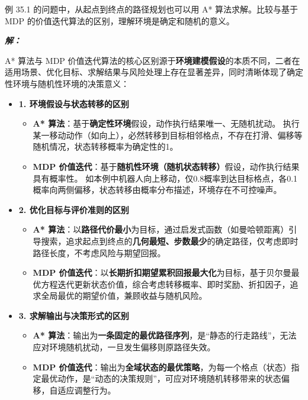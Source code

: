 \documentclass[12pt, a4paper]{article}
\newenvironment{solution}{
	\par\vspace{0.2cm}\noindent\textbf{\color{themecolor} \textit{解：}}
}{
	\par\vspace{0.5cm} %
}
\begin{document}
	\clearpage
	\begin{problem}[习题 35.8]
		例 35.1 的问题中，从起点到终点的路径规划也可以用 A* 算法求解。比较与基于 MDP 的价值迭代算法的区别，理解环境是确定和随机的意义。
	\end{problem}
	
	\begin{solution}
		A* 算法与 MDP 价值迭代算法的核心区别源于\textbf{环境建模假设}的本质不同，二者在适用场景、优化目标、求解结果与风险处理上存在显著差异，同时清晰体现了确定性环境与随机性环境的决策意义：
		
		\begin{itemize}
			\item[] \textbf{1. 环境假设与状态转移的区别}
			\begin{itemize}
				\item[] \textbf{A* 算法}：基于\textbf{确定性环境}假设，动作执行结果唯一、无随机扰动。
				执行某一移动动作（如向上），必然转移到目标相邻格点，不存在打滑、偏移等随机情况，状态转移概率为确定性的1。
				\item[] \textbf{MDP 价值迭代}：基于\textbf{随机性环境（随机状态转移）}假设，动作执行结果具有概率性。
				如本例中机器人向上移动，仅0.8概率到达目标格点，各0.1概率向两侧偏移，状态转移由概率分布描述，环境存在不可控噪声。
			\end{itemize}
			
			\item[] \textbf{2. 优化目标与评价准则的区别}
			\begin{itemize}
				\item[] \textbf{A* 算法}：以\textbf{路径代价最小}为目标，通过启发式函数（如曼哈顿距离）引导搜索，追求起点到终点的\textbf{几何最短、步数最少}的确定路径，仅考虑即时路径长度，不考虑风险与期望回报。
				\item[] \textbf{MDP 价值迭代}：以\textbf{长期折扣期望累积回报最大化}为目标，基于贝尔曼最优方程迭代更新状态价值，综合考虑转移概率、即时奖励、折扣因子，追求全局最优的期望价值，兼顾收益与随机风险。
			\end{itemize}
			
			\item[] \textbf{3. 求解输出与决策形式的区别}
			\begin{itemize}
				\item[] \textbf{A* 算法}：输出为\textbf{一条固定的最优路径序列}，是“静态的行走路线”，无法应对环境随机扰动，一旦发生偏移则原路径失效。
				\item[] \textbf{MDP 价值迭代}：输出为\textbf{全域状态的最优策略}，为每一个格点（状态）指定最优动作，是“动态的决策规则”，可应对环境随机转移带来的状态偏移，自适应调整行为。
			\end{itemize}
			

\end{itemize}
\end{solution}
\end{document}
